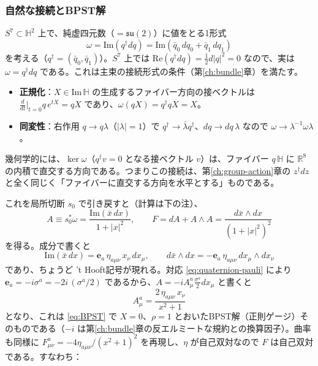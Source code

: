 \documentclass[uplatex, dvipdfmx, book]{jsbook}
\let\origsubsubsection\subsubsection
\renewcommand{\subsection}{\origsubsubsection}
\renewcommand{\subsubsection}{\paragraph}
\begin{document}
\subsection{自然な接続とBPST解}

$S^7 \subset \mathbb{H}^2$ 上で、純虚四元数（$= \mathfrak{su}(2)$）に値をとる1形式
\begin{equation}
    \omega = \mathrm{Im}\left( q^\dagger dq \right) = \mathrm{Im}\left( \bar{q}_0\, dq_0 + \bar{q}_1\, dq_1 \right)
    \label{eq:quaternion-hopf-connection}
\end{equation}
を考える（$q^\dagger = (\bar{q}_0, \bar{q}_1)$）。$S^7$ 上では $\mathrm{Re}(q^\dagger dq) = \frac{1}{2}d|q|^2 = 0$ なので、実は $\omega = q^\dagger dq$ である。これは主束の接続形式の条件（第\ref{ch:bundle}章）を満たす。
\begin{itemize}
    \item \textbf{正規化}：$X \in \mathrm{Im}\,\mathbb{H}$ の生成するファイバー方向の接ベクトルは $\frac{d}{dt}\big|_{t=0} q\, e^{tX} = qX$ であり、$\omega(qX) = q^\dagger q X = X$。
    \item \textbf{同変性}：右作用 $q \to q\lambda$（$|\lambda| = 1$）で $q^\dagger \to \bar{\lambda}q^\dagger$、$dq \to dq\,\lambda$ なので $\omega \to \lambda^{-1}\omega\lambda$。
\end{itemize}
幾何学的には、$\ker\omega$（$q^\dagger v = 0$ となる接ベクトル $v$）は、ファイバー $q\,\mathbb{H}$ に $\mathbb{R}^8$ の内積で直交する方向である。つまりこの接続は、第\ref{ch:group-action}章の $z^\dagger dz$ と全く同じく「ファイバーに直交する方向を水平とする」ものである。

これを局所切断 $s_0$ で引き戻すと（計算は下の注）、
\begin{equation}
    A \equiv s_0^*\omega = \frac{\mathrm{Im}(\bar{x}\, dx)}{1 + |x|^2}, \qquad
    F = dA + A \wedge A = \frac{d\bar{x} \wedge dx}{(1 + |x|^2)^2}
    \label{eq:quaternion-bpst}
\end{equation}
を得る。成分で書くと
\begin{equation}
    \mathrm{Im}(\bar{x}\, dx) = \bm{e}_a\, \eta_{a\mu\nu}\, x_\nu\, dx_\mu, \qquad
    d\bar{x} \wedge dx = -\bm{e}_a\, \eta_{a\mu\nu}\, dx_\mu \wedge dx_\nu
\end{equation}
であり、ちょうど 't Hooft記号が現れる。対応 \eqref{eq:quaternion-pauli} により $\bm{e}_a = -i\sigma^a = -2i\,(\sigma^a/2)$ であるから、$A = -i A^a_\mu \frac{\sigma^a}{2} dx_\mu$ と書くと
\begin{equation}
    A^a_\mu = \frac{2\,\eta_{a\mu\nu}\, x_\nu}{x^2 + 1}
\end{equation}
となり、これは \eqref{eq:BPST} で $X = 0$、$\rho = 1$ とおいたBPST解（正則ゲージ）そのものである（$-i$ は第\ref{ch:bundle}章の反エルミートな規約との換算因子）。曲率も同様に $F^a_{\mu\nu} = -4\eta_{a\mu\nu}/(x^2 + 1)^2$ を再現し、$\eta$ が自己双対なので $F$ は自己双対である。すなわち：
\end{document}
